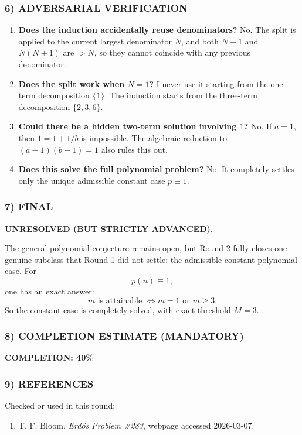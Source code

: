 \subsubsection*{6) ADVERSARIAL VERIFICATION}
\begin{enumerate}
\item \textbf{Does the induction accidentally reuse denominators?} No. The split is applied to the current largest denominator $N$, and both $N+1$ and $N(N+1)$ are $>N$, so they cannot coincide with any previous denominator.
\item \textbf{Does the split work when $N=1$?} I never use it starting from the one-term decomposition $\{1\}$. The induction starts from the three-term decomposition $\{2,3,6\}$.
\item \textbf{Could there be a hidden two-term solution involving $1$?} No. If $a=1$, then $1=1+1/b$ is impossible. The algebraic reduction to $(a-1)(b-1)=1$ also rules this out.
\item \textbf{Does this solve the full polynomial problem?} No. It completely settles only the unique admissible constant case $p\equiv 1$.
\end{enumerate}

\subsubsection*{7) FINAL}
\textbf{UNRESOLVED (BUT STRICTLY ADVANCED).}

The general polynomial conjecture remains open, but Round 2 fully closes one genuine subclass that Round 1 did not settle: the admissible constant-polynomial case. For
\[
 p(n)\equiv 1,
\]
one has an exact answer:
\[
 m \text{ is attainable } \Longleftrightarrow m=1 \text{ or } m\ge 3.
\]
So the constant case is completely solved, with exact threshold $M=3$.

\subsubsection*{8) COMPLETION ESTIMATE (MANDATORY)}
\textbf{COMPLETION: 40\%}

\subsubsection*{9) REFERENCES}
Checked or used in this round:
\begin{enumerate}
\item T. F. Bloom, \emph{Erd\H{o}s Problem \#283}, webpage accessed 2026-03-07.
\end{enumerate}

